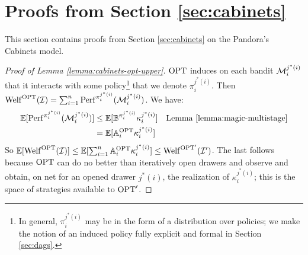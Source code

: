 \section{Proofs from Section \ref{sec:cabinets}} \label{app:cabinets}

This section contains proofs from Section \ref{sec:cabinets} on the Pandora's Cabinets model.

\begin{proof}[Proof of Lemma \ref{lemma:cabinets-opt-upper}]
	
	
	
$\mathrm{OPT}$ induces on each bandit $\mathcal{M}_i^{j^*(i)}$ that it interacts with some policy\footnote{In general, $\pi_i^{j^*(i)}$ may be in the form of a distribution over policies; we make the notion of an induced policy fully explicit and formal in Section \ref{sec:dags}.} that we denote $\pi_i^{j^*(i)}$.
	Then $\mathrm{Welf}^{\mathrm{OPT}}(\mathcal{I}) = \sum_{i=1}^n \mathrm{Perf}^{\pi_i^{j^*(i)}}(\mathcal{M}_i^{j^*(i)})$.
	We have:
	\begin{align*}
		\operatorname*{\mathbb{E}} [ \mathrm{Perf}^{\pi_i^{j^*(i)}}(\mathcal{M}_i^{j^*(i)}) ]
		&\leq \operatorname*{\mathbb{E}}[ \mathbb{B}^{\pi_i^{j^*(i)}} \kappa_i^{j^*(i)} ]  & \text{Lemma \ref{lemma:magic-multistage}} \\
		&=    \operatorname*{\mathbb{E}}[ \mathbb{A}^{\mathrm{OPT}}_i \kappa_i^{j^*(i)} ]  \\
	\end{align*}
	So $\operatorname*{\mathbb{E}}[ \mathrm{Welf}^{\mathrm{OPT}}(\mathcal{I}) ] \leq \operatorname*{\mathbb{E}}[ \sum_{i=1}^n \mathbb{A}^{\mathrm{OPT}}_i \kappa_i^{j^*(i)}] \leq \mathrm{Welf}^{\mathrm{OPT}'}(\mathcal{I}')$.
	The last follows because $\mathrm{OPT}$ can do no better than iteratively open drawers and observe and obtain, on net for an opened drawer $j^*(i)$, the realization of $\kappa_i^{j^*(i)}$; this is the space of strategies available to $\mathrm{OPT}'$.
	\end{proof}

